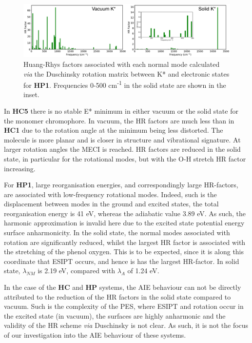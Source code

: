 \begin{figure}[t]
\centering
  \includegraphics[width=\linewidth]{5ConnectingCrystalStructure/HP1_DUSHIN}
  \caption{Huang-Rhys factors associated with each normal mode calculated \textit{via} the Duschinsky rotation matrix between K* and \szero{} electronic states for \textbf{HP1}. Frequencies 0-500 cm\textsuperscript{-1} in the solid state are shown in the inset.}
  \label{figure: HP1_DUSHIN}
\end{figure}

In \textbf{HC5} there is no stable E* minimum in either vacuum or the solid state for the monomer chromophore. In vacuum, the HR factors are much less than in \textbf{HC1} due to the rotation angle at the minimum being less distorted. The molecule is more planar and is closer in structure and vibrational signature. At larger rotation angles the MECI is reached. HR factors are reduced in the solid state, in particular for the rotational modes, but with the O-H stretch HR factor increasing.   %

For \textbf{HP1}, large reorganisation energies, and correspondingly large HR-factors, are associated with low-frequency rotational modes. Indeed, such is the displacement between modes in the ground and excited states, the total reorganisation energy is 41 eV, whereas the adiabatic value 3.89 eV. As such, the harmonic approximation is invalid here due to the excited state potential energy surface anharmonicity. In the solid state, the normal modes associated with rotation are significantly reduced, whilst the largest HR factor is associated with the stretching of the phenol oxygen. This is to be expected, since it is along this coordinate that ESIPT occurs, and hence is has the largest HR-factor. In solid state, $\lambda_{NM}$ is 2.19 eV, compared with $\lambda_{A}$ of 1.24 eV.  

In the case of the \textbf{HC} and \textbf{HP} systems, the AIE behaviour can not be directly attributed to the reduction of the HR factors in the solid state compared to vacuum. Such is the complexity of the PES, where ESIPT and rotation occur in the excited state (in vacuum), the surfaces are highly anharmonic and the validity of the HR scheme \textit{via} Duschinsky is not clear. As such, it is not the focus of our investigation into the AIE behaviour of these systems.


